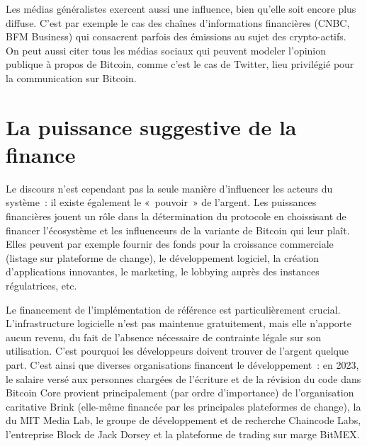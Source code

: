 Les médias généralistes exercent aussi une influence, bien qu'elle soit encore plus diffuse. C'est par exemple le cas des chaînes d'informations financières (CNBC, BFM Business) qui consacrent parfois des émissions au sujet des crypto-actifs. On peut aussi citer tous les médias sociaux qui peuvent modeler l'opinion publique à propos de Bitcoin, comme c'est le cas de Twitter, lieu privilégié pour la communication sur Bitcoin.

\section*{La puissance suggestive de la finance} %

Le discours n'est cependant pas la seule manière d'influencer les acteurs du système~: il existe également le «~pouvoir~» de l'argent. Les puissances financières jouent un rôle dans la détermination du protocole en choissisant de financer l'écosystème et les influenceurs de la variante de Bitcoin qui leur plaît. Elles peuvent par exemple fournir des fonds pour la croissance commerciale (listage sur plateforme de change), le développement logiciel, la création d'applications innovantes, le marketing, le lobbying auprès des instances régulatrices, etc.

Le financement de l'implémentation de référence est particulièrement crucial. L'infrastructure logicielle n'est pas maintenue gratuitement, mais elle n'apporte aucun revenu, du fait de l'absence nécessaire de contrainte légale sur son utilisation. C'est pourquoi les développeurs doivent trouver de l'argent quelque part. C'est ainsi que diverses organisations financent le développement~: en 2023, le salaire versé aux personnes chargées de l'écriture et de la révision du code dans Bitcoin Core provient principalement (par ordre d'importance) de l'organisation caritative Brink (elle-même financée par les principales plateformes de change), la  du MIT Media Lab, le groupe de développement et de recherche Chaincode Labs, l'entreprise Block de Jack Dorsey et la plateforme de trading sur marge BitMEX.

